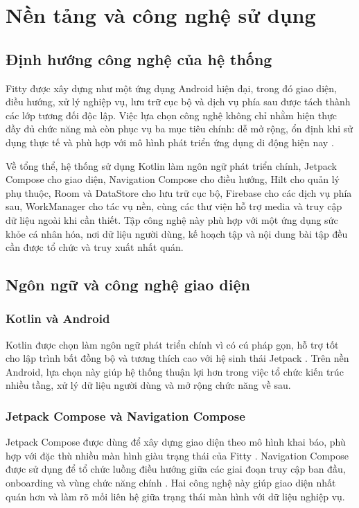 \chapter{Nền tảng và công nghệ sử dụng}

\section{Định hướng công nghệ của hệ thống}

Fitty được xây dựng như một ứng dụng Android hiện đại, trong đó giao diện, điều hướng, xử lý nghiệp vụ, lưu trữ cục bộ và dịch vụ phía sau được tách thành các lớp tương đối độc lập. Việc lựa chọn công nghệ không chỉ nhằm hiện thực đầy đủ chức năng mà còn phục vụ ba mục tiêu chính: dễ mở rộng, ổn định khi sử dụng thực tế và phù hợp với mô hình phát triển ứng dụng di động hiện nay \cite{android_jetpack}.

Về tổng thể, hệ thống sử dụng Kotlin làm ngôn ngữ phát triển chính, Jetpack Compose cho giao diện, Navigation Compose cho điều hướng, Hilt cho quản lý phụ thuộc, Room và DataStore cho lưu trữ cục bộ, Firebase cho các dịch vụ phía sau, WorkManager cho tác vụ nền, cùng các thư viện hỗ trợ media và truy cập dữ liệu ngoài khi cần thiết. Tập công nghệ này phù hợp với một ứng dụng sức khỏe cá nhân hóa, nơi dữ liệu người dùng, kế hoạch tập và nội dung bài tập đều cần được tổ chức và truy xuất nhất quán.

\section{Ngôn ngữ và công nghệ giao diện}

\subsection{Kotlin và Android}

Kotlin được chọn làm ngôn ngữ phát triển chính vì có cú pháp gọn, hỗ trợ tốt cho lập trình bất đồng bộ và tương thích cao với hệ sinh thái Jetpack \cite{android_jetpack}. Trên nền Android, lựa chọn này giúp hệ thống thuận lợi hơn trong việc tổ chức kiến trúc nhiều tầng, xử lý dữ liệu người dùng và mở rộng chức năng về sau.

\subsection{Jetpack Compose và Navigation Compose}

Jetpack Compose được dùng để xây dựng giao diện theo mô hình khai báo, phù hợp với đặc thù nhiều màn hình giàu trạng thái của Fitty \cite{android_compose}. Navigation Compose được sử dụng để tổ chức luồng điều hướng giữa các giai đoạn truy cập ban đầu, onboarding và vùng chức năng chính \cite{android_navigation_compose}. Hai công nghệ này giúp giao diện nhất quán hơn và làm rõ mối liên hệ giữa trạng thái màn hình với dữ liệu nghiệp vụ.

